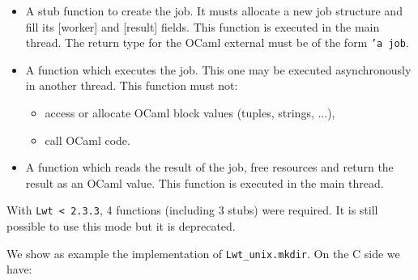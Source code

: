 \begin{itemize}
\item  A stub function to create the job. It musts allocate a new job
structure and fill its [worker] and [result] fields. This
function is executed in the main thread.
The return type for the OCaml external must be of the form {\tt 'a job}.
\item  A function which executes the job. This one may be executed asynchronously
in another thread. This function must not:

\begin{itemize}
\item  access or allocate OCaml block values (tuples, strings, ...),
\item  call OCaml code.

\end{itemize}
\item  A function which reads the result of the job, free resources and
return the result as an OCaml value. This function is executed in
the main thread.

\end{itemize}

With {\tt Lwt < 2.3.3}, 4 functions (including 3 stubs) were
required. It is still possible to use this mode but it is
deprecated.



We show as example the implementation of {\tt Lwt\_unix.mkdir}. On the C
side we have:




